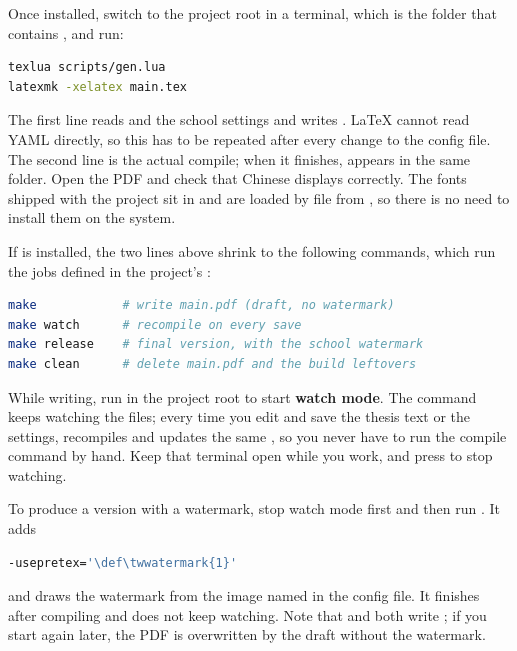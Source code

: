 Once installed, switch to the project root in a terminal, which is the folder that contains , and run:

\begin{lstlisting}[language=bash]
texlua scripts/gen.lua
latexmk -xelatex main.tex
\end{lstlisting}

The first line reads  and the school settings and writes . \LaTeX{} cannot read YAML directly, so this has to be repeated after every change to the config file. The second line is the actual compile; when it finishes,  appears in the same folder. Open the PDF and check that Chinese displays correctly. The fonts shipped with the project sit in  and are loaded by file from , so there is no need to install them on the system.

If  is installed, the two lines above shrink to the following commands, which run the jobs defined in the project's :

\begin{lstlisting}[language=bash]
make            # write main.pdf (draft, no watermark)
make watch      # recompile on every save
make release    # final version, with the school watermark
make clean      # delete main.pdf and the build leftovers
\end{lstlisting}

While writing, run  in the project root to start \textbf{watch mode}. The command keeps watching the files; every time you edit and save the thesis text or the settings,  recompiles and updates the same , so you never have to run the compile command by hand. Keep that terminal open while you work, and press  to stop watching.

To produce a version with a watermark, stop watch mode first and then run . It adds

\begin{lstlisting}[language=bash]
-usepretex='\def\twwatermark{1}'
\end{lstlisting}

and draws the watermark from the image named in the config file. It finishes after compiling and does not keep watching. Note that  and  both write ; if you start  again later, the PDF is overwritten by the draft without the watermark.

